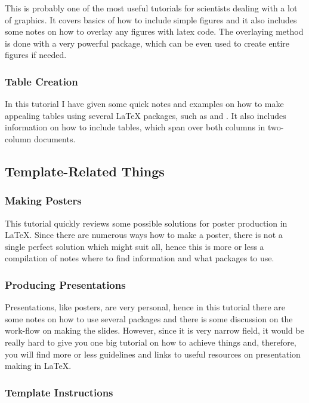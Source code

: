 \documentclass[
    draft
    ]{scrartcl}
\begin{document}
%
This is probably one of the most useful tutorials for scientists dealing with a
    lot of graphics.
%
It covers basics of how to include simple figures and it also includes some
    notes on how to overlay any figures with latex code.
%
The overlaying method is done with a very powerful  package, which can
    be even used to create entire figures if needed.
    
%
\subsubsection{Table Creation}

%
In this tutorial I have given some quick notes and examples on how to make
    appealing tables using several \LaTeX{} packages, such as  and
    .
%
It also includes information on how to include tables, which span over both
    columns in two-column documents.

%
\subsection{Template-Related Things}

%
\subsubsection{Making Posters}

%
This tutorial quickly reviews some possible solutions for poster production in
    \LaTeX{}.
%
Since there are numerous ways how to make a poster, there is not a single
    perfect solution which might suit all, hence this is more or less a
    compilation of notes where to find information and what packages to use.

%    
\subsubsection{Producing Presentations}

%
Presentations, like posters, are very personal, hence in this tutorial there are
    some notes on how to use several packages and there is some discussion on
    the work-flow on making the slides.
%
However, since it is very narrow field, it would be really hard to give you one
    big tutorial on how to achieve things and, therefore, you will find more or
    less guidelines and links to useful resources on presentation making in
    \LaTeX{}.

%
\subsubsection{Template Instructions}
\end{document}
